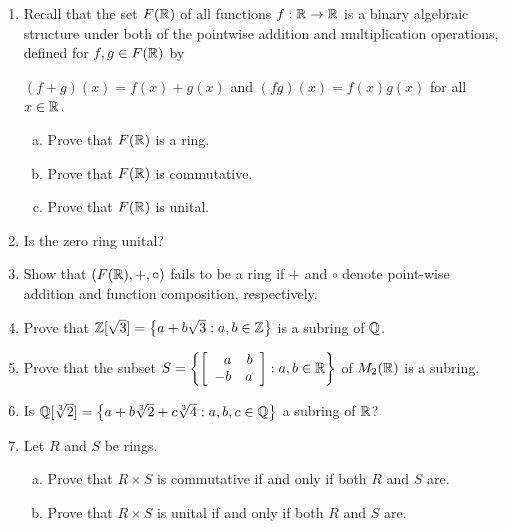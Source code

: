\documentclass[11pt,fleqn,dvipsnames,usenames]{article}
\begin{document}
\begin{enumerate}[1.]
\item Recall that the set $F(\R)$ of all functions $f:\R\to\R$ is a binary algebraic structure under both of the pointwise addition and multiplication operations, defined for $f,g\in F(\R)$ by
\begin{center}
$(f+g)(x) = f(x) + g(x)$ and $(fg)(x) = f(x)g(x)$ for all $x\in \R$.
\end{center}
\begin{enumerate}[(a)]
\item Prove that $F(\R)$ is a ring.
\item Prove that $F(\R)$ is commutative.
\item Prove that $F(\R)$ is unital.
\end{enumerate}

\item Is the zero ring unital?

\item Show that $(F(\R),+,\circ)$ fails to be a ring if $+$ and $\circ$ denote point-wise addition and function composition, respectively.
\item Prove that $\Z[\sqrt{3}] = \SET{a + b\sqrt{3}:a,b\in\Z}$ is a subring of $\Q$.
\item Prove that the subset $S = \SET{\MATRIX{rr}{a & b\\-b & a}:a,b\in \R}$ of $M_{2}(\R)$ is a subring.
\item Is $\Q[\sqrt[3]{2}] = \SET{a + b\sqrt[3]{2} + c\sqrt[3]{4}:a,b,c\in\Q}$ a subring of $\R$?
\item Let $R$ and $S$ be rings.
\begin{enumerate}[(a)]
\item Prove that $R\times S$ is commutative if and only if both $R$ and $S$ are.
\item Prove that $R\times S$ is unital if and only if both $R$ and $S$ are.
\end{enumerate}
\end{enumerate}
\end{document}

